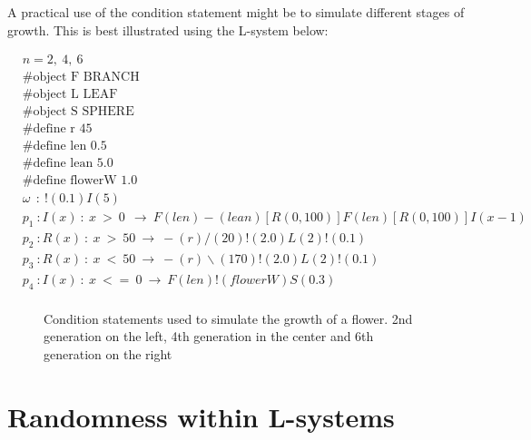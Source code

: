 \begin{flushleft}
\vspace{5mm}

A practical use of the condition statement might be to simulate different stages of growth. This is best illustrated using the L-system below: \\

\vspace{5mm}

\begin{equation} \label{conditional l-system example}
\begin{aligned}
	&n=2,~4,~6 \\
	&\#\text{object F BRANCH} \\
 	&\#\text{object L LEAF} \\
	&\#\text{object S SPHERE} \\
	&\#\text{define r 45} \\
	&\#\text{define len 0.5} \\
	&\#\text{define lean 5.0} \\
	&\#\text{define flowerW 1.0} \\
	&\omega~~ :~ !(0.1)I(5)\\
	&p_1~ :  I(x)~ :~ x~ >~ 0~~ \rightarrow~ F(len)-(lean)[R({0, 100})]F(len)[R({0, 100})]I(x-1)\\
	&p_2~ :  R(x)~ :~ x~ >~ 50~ \rightarrow~ -(r)/(20)!(2.0)L(2)!(0.1)\\
	&p_3~ :  R(x)~ :~ x~ <~ 50~ \rightarrow~ -(r)\backslash(170)!(2.0)L(2)!(0.1)\\
	&p_4~ :  I(x)~ :~ x~ <=~ 0~ \rightarrow~ F(len)!(flowerW)S(0.3)\\
\end{aligned}
\end{equation}

\begin{figure}[htbp]
	{\centering
		\vspace{7px}
		\setlength{\fboxrule}{1pt}
		\caption{Condition statements used to simulate the growth of a flower. 2nd generation on the left, 4th generation in the center and 6th generation on the right}
	}
\end{figure}

\FloatBarrier

\end{flushleft}


\section{Randomness within L-systems} \label{Randomness L-system Subsection}

